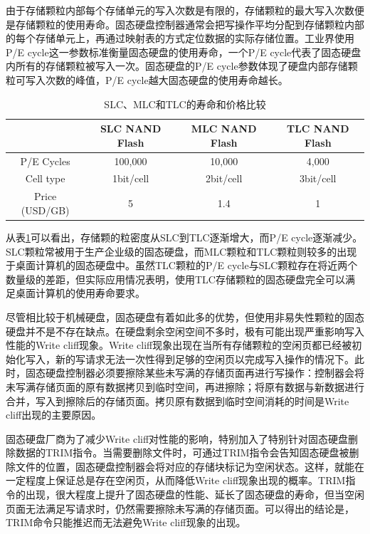 由于存储颗粒内部每个存储单元的写入次数是有限的，存储颗粒的最大写入次数便是存储颗粒的使用寿命。固态硬盘控制器通常会把写操作平均分配到存储颗粒内部的每个存储单元上，再通过映射表的方式定位数据的实际存储位置。工业界使用P/E cycle这一参数标准衡量固态硬盘的使用寿命，一个P/E cycle代表了固态硬盘内所有的存储颗粒被写入一次。固态硬盘的P/E cycle参数体现了硬盘内部存储颗粒可写入次数的峰值，P/E cycle越大固态硬盘的使用寿命越长。

\begin{table}[htb]
\centering
\caption{SLC、MLC和TLC的寿命和价格比较}
\begin{tabular}{|c|c|c|c|}
\hline  & SLC NAND Flash & MLC NAND Flash & TLC NAND Flash \\
\hline P/E Cycles & 100,000 & 10,000 & 4,000 \\
\hline Cell type & 1bit/cell & 2bit/cell & 3bit/cell \\
\hline Price (USD/GB) & 5 & 1.4 & 1 \\
\hline
\end{tabular}
\label{tab:slc-mlc-tlc-compare}
\end{table}

从表\ref{tab:slc-mlc-tlc-compare}可以看出，存储颗的粒密度从SLC到TLC逐渐增大，而P/E cycle逐渐减少。SLC颗粒常被用于生产企业级的固态硬盘，而MLC颗粒和TLC颗粒则较多的出现于桌面计算机的固态硬盘中。虽然TLC颗粒的P/E cycle与SLC颗粒存在将近两个数量级的差距，但实际应用情况表明，使用TLC存储颗粒的固态硬盘完全可以满足桌面计算机的使用寿命要求。

尽管相比较于机械硬盘，固态硬盘有着如此多的优势，但使用非易失性颗粒的固态硬盘并不是不存在缺点。在硬盘剩余空闲空间不多时，极有可能出现严重影响写入性能的Write cliff现象。Write cliff现象出现在当所有存储颗粒的空闲页都已经被初始化写入，新的写请求无法一次性得到足够的空闲页以完成写入操作的情况下。此时，固态硬盘控制器必须要擦除某些未写满的存储页面再进行写操作：控制器会将未写满存储页面的原有数据拷贝到临时空间，再进擦除；将原有数据与新数据进行合并，写入到擦除后的存储页面。拷贝原有数据到临时空间消耗的时间是Write cliff出现的主要原因。

固态硬盘厂商为了减少Write cliff对性能的影响，特别加入了特别针对固态硬盘删除数据的TRIM指令。当需要删除文件时，可通过TRIM指令会告知固态硬盘被删除文件的位置，固态硬盘控制器会将对应的存储块标记为空闲状态。这样，就能在一定程度上保证总是存在空闲页，从而降低Write cliff现象出现的概率。TRIM指令的出现，很大程度上提升了固态硬盘的性能、延长了固态硬盘的寿命，但当空闲页面无法满足写请求时，仍然需要擦除未写满的存储页面。可以得出的结论是，TRIM命令只能推迟而无法避免Write cliff现象的出现。

